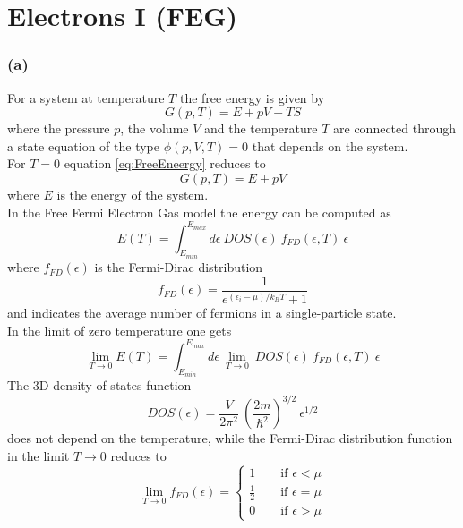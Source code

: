 \documentclass{article}
\begin{document}
\section{Electrons I (FEG)}

\subsubsection*{(a)}
For a system at temperature $T$ the free energy is given by 
\begin{equation*}
    G(p, T) = E + pV - TS
    \label{eq:FreeEneergy}
\end{equation*}
where the pressure $p$, the volume $V$ and the temperature $T$ are connected through a state equation of the type $\phi(p, V, T) = 0$ that depends
on the system. \\
For $T=0$ equation \ref{eq:FreeEneergy} reduces to
\begin{equation}
    G(p, T) = E + pV
\end{equation}
where $E$ is the energy of the system. \\
In the Free Fermi Electron Gas model the energy can be computed as
\begin{equation}
    E(T) = \int_{E_{min}}^{E_{max}} d\epsilon \ DOS(\epsilon) \ f_{FD}(\epsilon, T) \ \epsilon 
\end{equation}
where $f_{FD}(\epsilon)$ is the Fermi-Dirac distribution 
\begin{equation*}
    f_{FD}(\epsilon) = \frac{1}{e^{(\epsilon_i - \mu)/k_B T} + 1}
\end{equation*}
and indicates the average number of fermions in a single-particle state. \\
In the limit of zero temperature one gets
\begin{equation}
    \lim_{T \to 0} E(T) = \int_{E_{min}}^{E_{max}} d\epsilon \ \lim_{T \to 0} \ DOS(\epsilon) \ f_{FD}(\epsilon, T) \ \epsilon
    \label{eq:energy_FEFG}
\end{equation}
The 3D density of states function 
\begin{equation}
    DOS(\epsilon) = \frac{V}{2\pi^2} \ \left(\frac{2m}{\hbar^2}\right)^{3/2} \ \epsilon^{1/2}
\end{equation}
does not depend on the temperature, while the Fermi-Dirac distribution function in the limit $T \to 0$ reduces to 
\begin{equation}
    \lim_{T \to 0} f_{FD}(\epsilon) = 
    \begin{cases}
        1 \qquad \text{if } \epsilon < \mu \\
        \frac{1}{2} \qquad \text{if } \epsilon = \mu \\ 
        0 \qquad \text{if } \epsilon > \mu
    \end{cases}
\end{equation}
\end{document}
